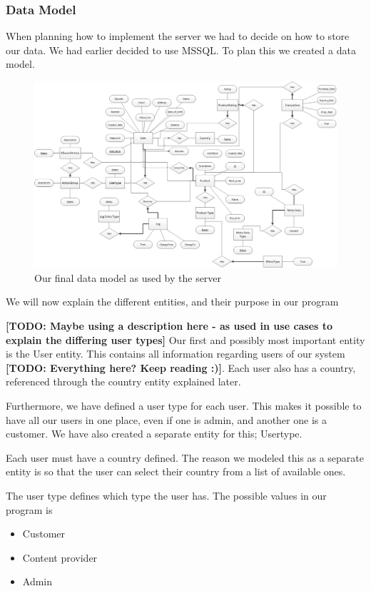 \subsubsection{Data Model}
When planning how to implement the server we had to decide on how to store our data. We had earlier decided to use MSSQL. To plan this we created a data model.
\begin{figure}[t]
  \includegraphics[width=\textwidth]{illustrations/Datamodel.png}
  \caption{Our final data model as used by the server}
  \label{fig:datamodel}
\end{figure}
We will now explain the different entities, and their purpose in our program

\textbf{[TODO: Maybe using a description here - as used in use cases to explain the differing user types]}
Our first and possibly most important entity is the User entity. This contains all information regarding users of our system \textbf{[TODO: Everything here? Keep reading :)]}. Each user also has a country, referenced through the country entity explained later.

Furthermore, we have defined a user type for each user. This makes it possible to have all our users in one place, even if one is admin, and another one is a customer. We have also created a separate entity for this; Usertype.

Each user must have a country defined. The reason we modeled this as a separate entity is so that the user can select their country from a list of available ones.

The user type defines which type the user has. The possible values in our program is
\begin{itemize}
	\item Customer
	\item Content provider
	\item Admin
\end{itemize}

